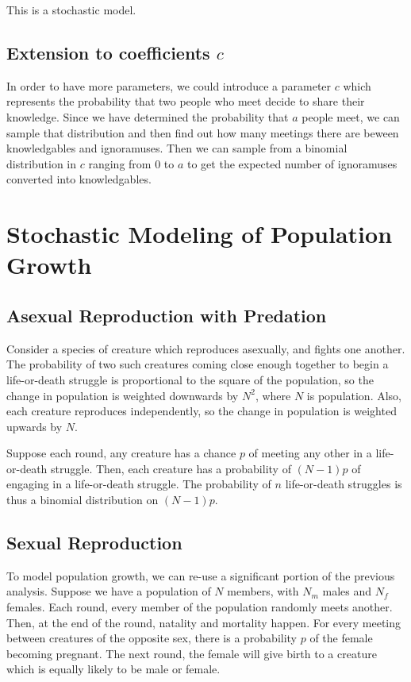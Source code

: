 \documentclass{article}
\begin{document}
This is a stochastic model.

\subsection{Extension to coefficients $c$}

In order to have more parameters, we could introduce a parameter $c$
	which represents the probability that two people who meet
	decide to share their knowledge.
Since we have determined the probability that $a$ people meet,
	we can sample that distribution and then find out how many
	meetings there are beween knowledgables and ignoramuses.
Then we can sample from a binomial distribution in $c$ ranging from $0$ to $a$
	to get the expected number of ignoramuses converted into knowledgables.

\section{Stochastic Modeling of Population Growth}

\subsection{Asexual Reproduction with Predation}

Consider a species of creature which reproduces asexually, and fights one another.
The probability of two such creatures coming close enough together to begin a life-or-death
	struggle is proportional to the square of the population,
	so the change in population is weighted downwards by $N^2$, where $N$ is population.
Also, each creature reproduces independently, so the change in population is weighted 
	upwards by $N$.

Suppose each round, any creature has a chance $p$ of meeting any other in a life-or-death struggle.
Then, each creature has a probability of $(N-1)p$ of engaging in a life-or-death struggle.
The probability of $n$ life-or-death struggles is thus a binomial distribution on $(N-1)p$.



\subsection{Sexual Reproduction}

To model population growth, we can re-use a significant portion of the previous analysis.
Suppose we have a population of $N$ members, with $N_m$ males and $N_f$ females.
Each round, every member of the population randomly meets another.
Then, at the end of the round, natality and mortality happen.
For every meeting between creatures of the opposite sex,
	there is a probability $p$ of the female becoming pregnant.
The next round, the female will give birth to a creature which is equally likely
	to be male or female.
\end{document}
